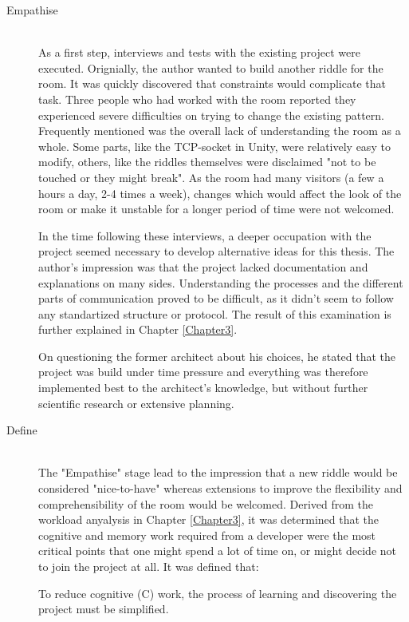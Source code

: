 \begin{description}
	\item [Empathise]\hfill \\
	      As a first step, interviews and tests with the existing project were executed.
	      Orignially, the author wanted to build another riddle for the room.
	      It was quickly discovered that constraints would complicate that task.
	      Three people who had worked with the room reported they experienced severe difficulties
	      on trying to change the existing pattern.
	      Frequently mentioned was the overall lack of understanding the room as a whole.
	      Some parts, like the TCP-socket in Unity, were relatively easy to modify, others, like the riddles themselves were disclaimed
	      "not to be touched or they might break".
	      As the room had many visitors (a few a hours a day, 2-4 times a week), changes which would affect the look
	      of the room or make it unstable for a longer period of time were not welcomed.

	      In the time following these interviews,
	      a deeper occupation with the project seemed necessary to develop alternative ideas for this thesis.
	      The author's impression was that the project lacked documentation and explanations on many sides.
	      Understanding the processes and the different parts of communication proved to be difficult,
	      as it didn't seem to follow any standartized structure or protocol.
	      The result of this examination is further explained in Chapter \ref{Chapter3}.

	      On questioning the former architect about his choices,
	      he stated that the project was build under time pressure
	      and everything was therefore implemented best to the architect's knowledge,
	      but without further scientific research or extensive planning.

	\item [Define]\hfill \\
	      The "Empathise" stage lead to the impression that a new riddle
	      would be considered "nice-to-have" whereas
		  extensions to improve the flexibility and comprehensibility of the room would be welcomed.
		  Derived from the workload anyalysis in Chapter \ref{Chapter3},	 
	it was determined that the cognitive and memory work required from a developer were the most critical points
	that one might spend a lot of time on, or might decide not to join the project at all.
	It was defined that:

	To reduce cognitive (C) work, the process of learning and discovering the project must be simplified.


\end{description}
